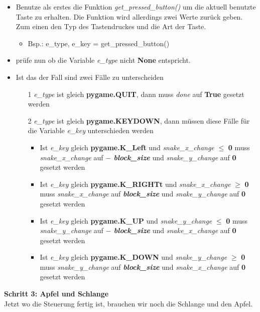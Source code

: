 \begin{itemize}
	\item Benutze als erstes die Funktion \textit{get\_pressed\_button()} um die aktuell benutzte Taste zu erhalten. Die Funktion wird allerdings zwei Werte zurück geben. Zum einen den Typ des Tastendruckes und die Art der Taste.
	\begin{itemize}
		\item Bsp.: e\_type, e\_key = get\_pressed\_button()
	\end{itemize}
	\item prüfe nun ob die Variable \textit{e\_type} nicht \textbf{None} entspricht.
	\item Ist das der Fall sind zwei Fälle zu unterscheiden
	\begin{itemize}
		\item[1] \textit{e\_type} ist gleich \textbf{pygame.QUIT}, dann muss \textit{done} auf \textbf{True} gesetzt werden
		\item[2] \textit{e\_type} ist gleich \textbf{pygame.KEYDOWN}, dann müssen diese Fälle für die Variable \textit{e\_key} unterschieden werden
		\begin{itemize}
			\item Ist \textit{e\_key} gleich \textbf{pygame.K\_Left} und \textit{snake\_x\_change} $\leq$ \textbf{0} muss \textit{snake\_x\_change} auf \textbf{$-$ \textit{block\_size}} und \textit{snake\_y\_change} auf \textbf{0} gesetzt werden
			\item Ist \textit{e\_key} gleich \textbf{pygame.K\_RIGHTt} und \textit{snake\_x\_change} $\geq$ \textbf{0} muss \textit{snake\_x\_change} auf \textbf{\textit{block\_size}} und \textit{snake\_y\_change} auf \textbf{0} gesetzt werden
			\item Ist \textit{e\_key} gleich \textbf{pygame.K\_UP} und \textit{snake\_y\_change} $\leq$ \textbf{0} muss \textit{snake\_y\_change} auf \textbf{$-$ \textit{block\_size}} und \textit{snake\_x\_change} auf \textbf{0} gesetzt werden
			\item Ist \textit{e\_key} gleich \textbf{pygame.K\_DOWN} und \textit{snake\_y\_change} $\geq$ \textbf{0} muss \textit{snake\_y\_change} auf \textbf{\textit{block\_size}} und \textit{snake\_x\_change} auf \textbf{0} gesetzt werden
		\end{itemize}
	\end{itemize}
\end{itemize}
\textbf{Schritt 3: Apfel und Schlange}\\
Jetzt wo die Steuerung fertig ist, brauchen wir noch die Schlange und den Apfel.
